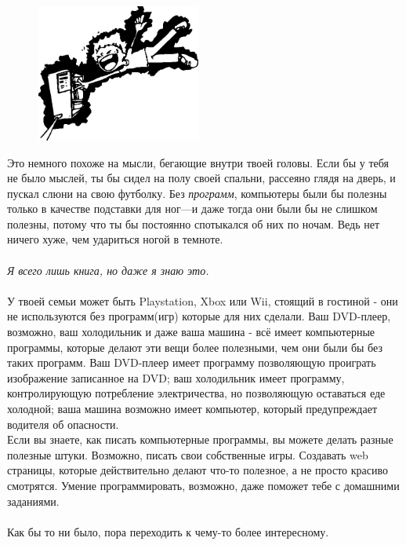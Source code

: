 \begin{figure}
\begin{center}
\includegraphics[width=0.48\textwidth]{electrocute.eps}
\end{center}
\end{figure}

Это немного похоже на мысли, бегающие внутри твоей головы. Если бы у тебя не было мыслей, ты бы сидел на полу своей спальни, рассеяно глядя на дверь, и пускал слюни на свою футболку. Без \emph{программ}, компьютеры были бы полезны только в качестве подставки для ног---и даже тогда они были бы не слишком полезны, потому что ты бы постоянно спотыкался об них по ночам. Ведь нет ничего хуже, чем удариться ногой в темноте.
\\
\\
\emph{Я всего лишь книга, но даже я знаю это. }
\\
\\
У твоей семьи может быть Playstation, Xbox или Wii, стоящий в гостиной - они не используются без программ(игр) которые для них сделали. Ваш DVD-плеер, возможно, ваш холодильник и даже ваша машина - всё имеет компьютерные программы, которые делают эти вещи более полезными, чем они были бы без таких программ. Ваш DVD-плеер имеет программу позволяющую проиграть изображение записанное на DVD; ваш холодильник имеет программу, контролирующую потребление электричества, но позволяющую оставаться еде холодной; ваша машина возможно имеет компьютер, который предупреждает водителя об опасности.\\
Если вы знаете, как писать компьютерные программы, вы можете делать разные полезные штуки. Возможно, писать свои собственные игры. Создавать web страницы, которые действительно делают что-то полезное, а не просто красиво смотрятся. Умение программировать, возможно, даже поможет тебе с домашними заданиями.\\
\\
Как бы то ни было, пора переходить к чему-то более интересному.


